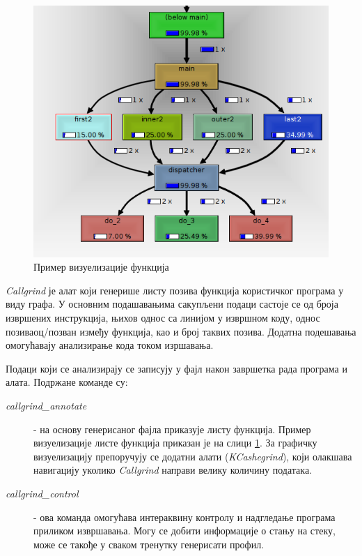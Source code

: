 \documentclass[12pt,oneside]{memoir}
\begin{document}
\begin{figure}[h!]
\begin{center}
\includegraphics[scale=0.75]{slika18.png}
\end{center}
\caption{Пример визуелизације функција}
\label{fig:callgrind}
\end{figure}

\indent \textit{Callgrind} је алат који генерише листу позива функција користичког програма у виду графа. У основним подашавањима сакупљени подаци састоје се од броја извршених инструкција, њихов однос са линијом у извршном коду, однос позиваоц/позван између функција, као и број таквих позива. Додатна подешавања омогућавају анализирање кода током изршавања. 

\indent Подаци који се анализирају се записују у фајл након завршетка рада програма и алата. Подржане команде су:

\begin{description}
	\item[\textit{callgrind\_annotate}] - на основу генерисаног фајла приказује листу функција. Пример визуелизације листе функција приказан је на слици \ref{fig:callgrind}. За графичку визуелизацију препоручују се додатни алати (\textit{KCashegrind}), који олакшава навигацију уколико \textit{Callgrind} направи велику количину података.
	\item[\textit{callgrind\_control}] - ова команда омогућава интераквину контролу и надгледање програма приликом извршавања. Могу се добити информације о стању на стеку, може се такође у сваком тренутку генерисати профил. 
\end{description}
\end{document}
